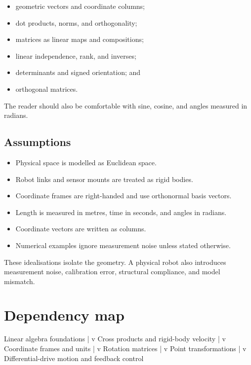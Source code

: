 \documentclass[
  australian,
  12pt,
  letterpaper,
  DIV=11,
  numbers=noendperiod,
  twoside]{scrreprt}
\newenvironment{Shaded}{\begin{snugshade}}{\end{snugshade}}
\newcommand{\NormalTok}[1]{\textcolor[rgb]{0.00,0.23,0.31}{#1}}
\providecommand{\tightlist}{%
  \setlength{\itemsep}{0pt}\setlength{\parskip}{0pt}}
\begin{document}
\begin{itemize}
\tightlist
\item
  geometric vectors and coordinate columns;
\item
  dot products, norms, and orthogonality;
\item
  matrices as linear maps and compositions;
\item
  linear independence, rank, and inverses;
\item
  determinants and signed orientation; and
\item
  orthogonal matrices.
\end{itemize}

The reader should also be comfortable with sine, cosine, and angles
measured in radians.

\subsection*{Assumptions}\label{assumptions-1}

\begin{itemize}
\tightlist
\item
  Physical space is modelled as Euclidean space.
\item
  Robot links and sensor mounts are treated as rigid bodies.
\item
  Coordinate frames are right-handed and use orthonormal basis vectors.
\item
  Length is measured in metres, time in seconds, and angles in radians.
\item
  Coordinate vectors are written as columns.
\item
  Numerical examples ignore measurement noise unless stated otherwise.
\end{itemize}

These idealisations isolate the geometry. A physical robot also
introduces measurement noise, calibration error, structural compliance,
and model mismatch.

\section*{Dependency map}\label{dependency-map-1}


\begin{Shaded}
\begin{Highlighting}[]
\NormalTok{Linear algebra foundations}
\NormalTok{        |}
\NormalTok{        v}
\NormalTok{Cross products and rigid{-}body velocity}
\NormalTok{        |}
\NormalTok{        v}
\NormalTok{Coordinate frames and units}
\NormalTok{        |}
\NormalTok{        v}
\NormalTok{Rotation matrices}
\NormalTok{        |}
\NormalTok{        v}
\NormalTok{Point transformations}
\NormalTok{        |}
\NormalTok{        v}
\NormalTok{Differential{-}drive motion and feedback control}
\end{Highlighting}
\end{Shaded}
\end{document}
